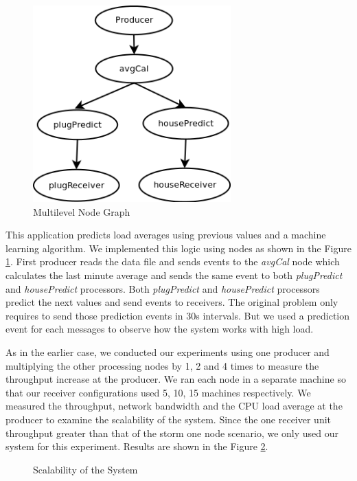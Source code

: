 \begin{figure}[!t]
        \centering
        \includegraphics[width=3.0in]{multigraph.png}
        \caption{Multilevel Node Graph}
        \label{multigraph}
\end{figure}

This application predicts load averages using previous values and a machine learning algorithm. We implemented this logic using nodes as shown in the Figure \ref{multigraph}. First producer reads the data file and sends events to the \textit{avgCal} node which calculates the last minute average and sends the same event to both \textit{plugPredict} and \textit{housePredict} processors. Both \textit{plugPredict} and \textit{housePredict} processors predict the next values and send events to receivers. The original problem only requires to send those prediction events in 30s intervals. But we used a prediction event for each messages to observe how the system works with high load.
 
As in the earlier case, we conducted our experiments using one producer and multiplying the other processing nodes by 1, 2 and 4 times to measure the throughput increase at the producer. We ran each node in a separate machine so that our receiver configurations used 5, 10, 15 machines respectively. We measured the throughput,  network bandwidth and the CPU load average at the producer to examine the scalability of the system. Since the one receiver unit throughput greater than that of the storm one node scenario, we only used our system for this experiment.  Results are shown in the Figure \ref{scalability}.


\begin{figure}[!t]
        \centering
        \hfil
        \hfil
        \hfil
        \caption{Scalability of the System}
        \label{scalability}
\end{figure}


